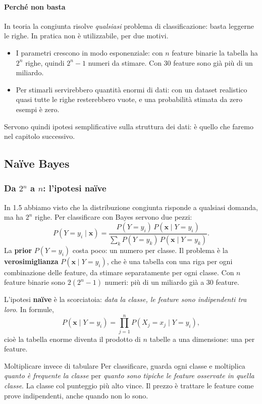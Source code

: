 \documentclass[12pt]{extarticle}
\begin{document}
\paragraph{Perché non basta}
In teoria la congiunta risolve \emph{qualsiasi} problema di classificazione: basta leggerne le righe. In pratica non è utilizzabile, per due motivi.
\begin{itemize}
    \item I parametri crescono in modo esponenziale: con $n$ feature binarie la tabella ha $2^n$ righe, quindi $2^n-1$ numeri da stimare. Con 30 feature sono già più di un miliardo.
    \item Per stimarli servirebbero quantità enormi di dati: con un dataset realistico quasi tutte le righe resterebbero vuote, e una probabilità stimata da zero esempi è zero.
\end{itemize}
Servono quindi ipotesi semplificative sulla struttura dei dati: è quello che faremo nel capitolo successivo.

\subsection{Naïve Bayes}

\subsubsection{Da $2^n$ a $n$: l'ipotesi naïve}

\noindent In 1.5 abbiamo visto che la distribuzione congiunta risponde a qualsiasi domanda, ma ha $2^n$ righe. Per classificare con Bayes servono due pezzi:
\[
P(Y=y_i \mid \mathbf{x}) = \frac{P(Y=y_i)\,P(\mathbf{x} \mid Y=y_i)}{\sum_k P(Y=y_k)\,P(\mathbf{x}\mid Y=y_k)} .
\]
La \textbf{prior} $P(Y=y_i)$ costa poco: un numero per classe. Il problema è la \textbf{verosimiglianza} $P(\mathbf{x}\mid Y=y_i)$, che è una tabella con una riga per ogni combinazione delle feature, da stimare separatamente per ogni classe. Con $n$ feature binarie sono $2(2^n-1)$ numeri: più di un miliardo già a 30 feature.

\noindent L'ipotesi \textbf{naïve} è la scorciatoia: \emph{data la classe, le feature sono indipendenti tra loro}. In formule,
\[
P(\mathbf{x} \mid Y=y_i) = \prod_{j=1}^n P(X_j=x_j \mid Y=y_i),
\]
cioè la tabella enorme diventa il prodotto di $n$ tabelle a una dimensione: una per feature.

\begin{ideabox}{Moltiplicare invece di tabulare}
Per classificare, guarda ogni classe e moltiplica \emph{quanto è frequente la classe} per \emph{quanto sono tipiche le feature osservate in quella classe}. La classe col punteggio più alto vince. Il prezzo è trattare le feature come prove indipendenti, anche quando non lo sono.
\end{ideabox}
\end{document}
